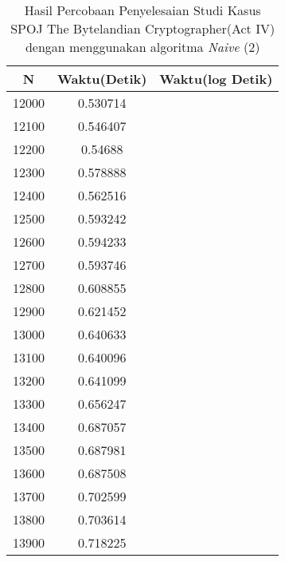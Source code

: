 \begin{table}[H]
\centering
\caption {Hasil Percobaan Penyelesaian Studi Kasus SPOJ The Bytelandian Cryptographer(Act IV) dengan menggunakan algoritma \textit{Naive} (2)}
\begin{tabular}{|c|c|c|}\hline
N&Waktu(Detik)&Waktu(log Detik)\\ \hline
12000&0.530714\\ \hline
12100&0.546407\\ \hline
12200&0.54688\\ \hline
12300&0.578888\\ \hline
12400&0.562516\\ \hline
12500&0.593242\\ \hline
12600&0.594233\\ \hline
12700&0.593746\\ \hline
12800&0.608855\\ \hline
12900&0.621452\\ \hline
13000&0.640633\\ \hline
13100&0.640096\\ \hline
13200&0.641099\\ \hline
13300&0.656247\\ \hline
13400&0.687057\\ \hline
13500&0.687981\\ \hline
13600&0.687508\\ \hline
13700&0.702599\\ \hline
13800&0.703614\\ \hline
13900&0.718225\\ \hline
\end{tabular}
\label{tab:res4}
\end{table}
